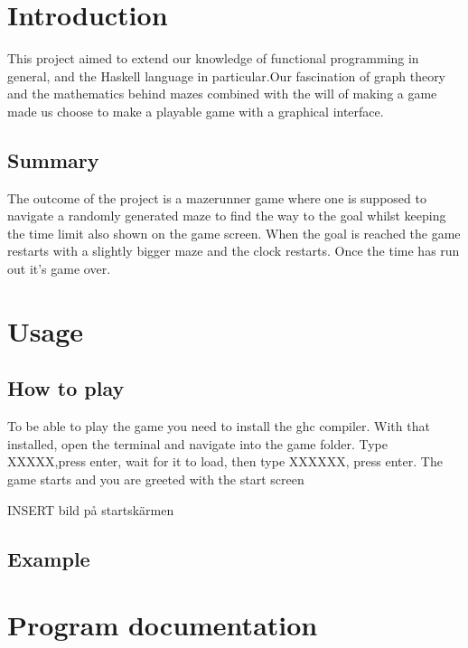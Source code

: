 \documentclass[12pt, a4paper]{article}
\begin{document}
\maketitle

\newpage


\tableofcontents


\newpage
\section{Introduction}
This project aimed to extend our knowledge of functional programming in general, and the Haskell language in particular.Our fascination of graph theory and the mathematics behind mazes combined with the will of making a game made us choose to make a playable game with a graphical interface.


\subsection{Summary}
The outcome of the project is a mazerunner game where one is supposed to navigate a randomly generated maze to find the way to the goal whilst keeping the time limit also shown on the game screen. When the goal is reached the game restarts with a slightly bigger maze and the clock restarts. Once the time has run out it's game over.


\section{Usage}
\subsection{How to play}
To be able to play the game you need to install the ghc compiler. With that installed, open the terminal and navigate into the game folder. Type XXXXX,press enter, wait for it to load, then type XXXXXX, press enter. The game starts and you are greeted with the start screen

INSERT bild på startskärmen

\subsection{Example}


\newpage
\section{Program documentation}
\end{document}

